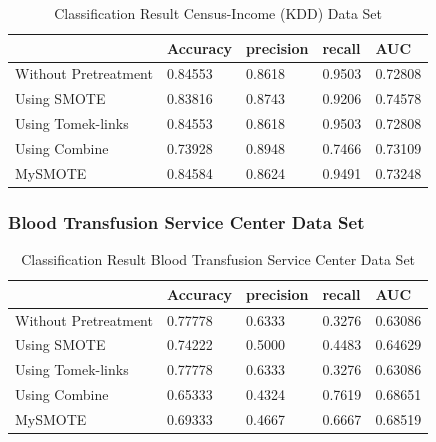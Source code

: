 \begin{table}[H]
    \caption{Classification Result Census-Income (KDD) Data Set}
    \centering
    \begin{tabular}{|l|l|l|l|l|}
    \hline
         & Accuracy & precision & recall & AUC \\ \hline
        Without Pretreatment & 0.84553 & 0.8618 & 0.9503 & 0.72808 \\ \hline
        Using SMOTE & 0.83816 & 0.8743 & 0.9206 & 0.74578 \\ \hline
        Using Tomek-links & 0.84553 & 0.8618 & 0.9503 & 0.72808 \\ \hline
        Using Combine & 0.73928 & 0.8948 & 0.7466 & 0.73109 \\ \hline
        MySMOTE & 0.84584 & 0.8624 & 0.9491 & 0.73248 \\ \hline
    \end{tabular}
\end{table}


\subsubsection{Blood Transfusion Service Center Data Set}

\begin{table}[H]
    \caption{Classification Result Blood Transfusion Service Center Data Set}
    \centering
    \begin{tabular}{|l|l|l|l|l|}
    \hline
         & Accuracy & precision & recall & AUC \\ \hline
        Without Pretreatment & 0.77778 & 0.6333 & 0.3276 & 0.63086 \\ \hline
        Using SMOTE & 0.74222 & 0.5000 & 0.4483 & 0.64629 \\ \hline
        Using Tomek-links & 0.77778 & 0.6333 & 0.3276 & 0.63086 \\ \hline
        Using Combine & 0.65333 & 0.4324 & 0.7619 & 0.68651 \\ \hline
        MySMOTE & 0.69333 & 0.4667 & 0.6667 & 0.68519 \\ \hline
    \end{tabular}
\end{table}

